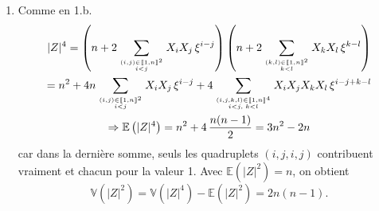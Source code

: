 \begin{enumerate}
\begin{enumerate}
    \item Comme en 1.b.
\begin{multline*}
|Z|^4 = \left( n + 2 \sum_{(i,j)\in \llbracket 1,n \rrbracket^2 \atop i < j}X_i X_j \, \xi^{i-j}\right)
        \left( n + 2 \sum_{(k,l)\in \llbracket 1,n \rrbracket^2 \atop k < l}X_kX_l\, \xi^{k-l}\right)\\
= n^2 + 4n \sum_{(i,j)\in \llbracket 1,n \rrbracket^2 \atop i < j}X_i X_j \, \xi^{i-j} + 
4 \sum_{(i,j,k,l)\in \llbracket 1,n \rrbracket^4 \atop i< j, \; k < l} X_i X_j X_kX_l\, \xi^{i-j+k-l}  \\
\Rightarrow \mathbb{E} \left(|Z|^4\right) = n^2 + 4\,  \frac{n(n-1)}{2} = 3n^2 - 2n
\end{multline*}
car dans la dernière somme, seuls les quadruplets $(i,j,i,j)$ contribuent vraiment et chacun pour la valeur 1.\newline
Avec $\mathbb{E}(|Z|^2) = n$, on obtient
\[
  \mathbb{V}(|Z|^2) = \mathbb{V}(|Z|^4) - \mathbb{E}(|Z|^2) = 2n(n-1).
\]
  \end{enumerate}
\end{enumerate}
  
